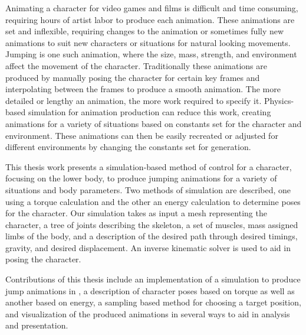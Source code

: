 
Animating a character for video games and films is difficult and time consuming, requiring hours of artist labor to produce each animation.  These animations are set and inflexible, requiring changes to the animation or sometimes fully new animations to suit new characters or situations for natural looking movements.  Jumping is one such animation, where the size, mass, strength, and environment affect the movement of the character.  Traditionally these animations are produced by manually posing the character for certain key frames and interpolating between the frames to produce a smooth animation.  The more detailed or lengthy an animation, the more work required to specify it.  Physics-based simulation for animation production can reduce this work, creating animations for a variety of situations based on constants set for the character and environment.  These animations can then be easily recreated or adjusted for different environments by changing the constants set for generation.

This thesis work presents a simulation-based method of control for a character, focusing on the lower body, to produce jumping animations for a variety of situations and body parameters.  Two methods of simulation are described, one using a torque calculation and the other an energy calculation to determine poses for the character.  Our simulation takes as input a mesh representing the character, a tree of joints describing the skeleton, a set of muscles, mass assigned limbs of the body, and a description of the desired path through desired timings, gravity, and desired displacement.  An inverse kinematic solver is used to aid in posing the character.

Contributions of this thesis include an implementation of a simulation to produce jump animations in \unity{}, a description of character poses based on torque as well as another based on energy, a sampling based method for choosing a target position, and visualization of the produced animations in several ways to aid in analysis and presentation.

